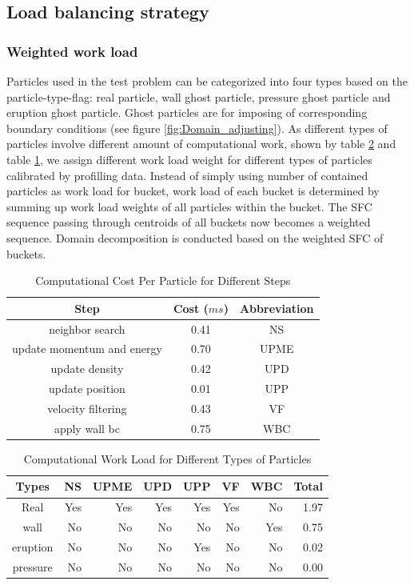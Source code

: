 \documentclass[conference,compsoc]{IEEEtran}
\begin{document}
\subsection{Load balancing strategy}
\subsubsection{Weighted work load} \label{sec:Weighted_work_load}
Particles used in the test problem can be categorized into four types based on the particle-type-flag: real particle, wall ghost particle, pressure ghost particle and eruption ghost particle. Ghost particles are for imposing of corresponding boundary conditions (see figure \ref{fig:Domain_adjusting}). As different types of particles involve different amount of computational work, shown by table \ref{tab:Computational_cost_particles} and table \ref{tab:Computational_cost_steps}, we assign different work load weight for different types of particles calibrated by profilling data. Instead of simply using number of contained particles as work load for bucket, work load of each bucket is determined by summing up work load weights of all particles within the bucket. The SFC sequence passing through centroids of all buckets now becomes a weighted sequence. Domain decomposition  is conducted based on the weighted SFC of buckets.
\begin{table}[t!]
  \renewcommand{\arraystretch}{1.2}
  \centering
  \caption{Computational Cost Per Particle for Different Steps}
  \label{tab:Computational_cost_steps}
  \begin{tabular}{|c|c|c|}
    \hline
    Step & Cost ($ms$) & Abbreviation\\
    \hline
    neighbor search & 0.41 & NS\\
    \hline
    update momentum and energy & 0.70 & UPME\\
    \hline
    update density & 0.42 & UPD\\
    \hline
    update position & 0.01 & UPP\\
    \hline
    velocity filtering& 0.43 & VF\\
    \hline
    apply wall bc & 0.75 & WBC\\
    \hline
  \end{tabular}
\end{table}
\begin{table}[t!]
  \renewcommand{\arraystretch}{1.2}
  \centering
  \caption{Computational Work Load for Different Types of Particles}
  \label{tab:Computational_cost_particles}
  \begin{tabular}{|c|r|r|r|r|r|r|r|}
    \hline
    Types & NS & UPME & UPD & UPP &VF &WBC &Total\\
    \hline
    Real & Yes & Yes & Yes & Yes & Yes & No & 1.97\\
    \hline
    wall & No & No & No & No & No & Yes &0.75\\
    \hline
    eruption & No & No & No & Yes & No & No & 0.02\\
    \hline
    pressure & No & No & No & No & No & No & 0.00\\
    \hline
  \end{tabular}
\end{table}
\end{document}
